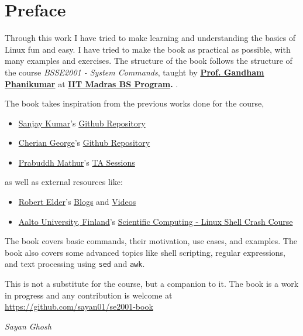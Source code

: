 \chapter*{Preface}

Through this work I have tried to make learning and
understanding the basics of Linux fun and easy. I have
tried to make the book as practical as possible, with
many examples and exercises. The structure of the book
follows the structure of the course \textit{BSSE2001
- System Commands}, taught by
\textbf{
\href{https://home.iitm.ac.in/gphani/}{Prof. Gandham Phanikumar}
}
at
\textbf{
\href{https://study.iitm.ac.in/ds/}{IIT Madras BS Program}.
}.

The book takes inspiration from the previous works done for the course,

\begin{itemize}
	\item \href{https://github.com/prassr}{Sanjay Kumar}'s
	\href{https://github.com/prassr/gnu-linux-commands}{Github Repository}
	\item \href{https://github.com/cheriangeorge}{Cherian George}'s
	\href{https://github.com/prassr/gnu-linux-commands}{Github Repository}
	\item \href{https://github.com/prabuddhmathur}{Prabuddh Mathur}'s
	\href{https://www.youtube.com/playlist?list=PLLuZiiAWg2wpaEOBWAVO7Jl35MQkOyi6-}{TA Sessions}
\end{itemize}

as well as external resources like:

\begin{itemize}
	\item \href{https://www.robertelder.org/}{Robert Elder}'s
	\href{https://blog.robertelder.org/}{Blogs} and
	\href{https://www.youtube.com/@RobertElderSoftware/shorts}{Videos}
	\item \href{https://www.aalto.fi/en}{Aalto University, Finland}'s
	\href{https://scicomp.aalto.fi/scicomp/shell/}{Scientific Computing - Linux Shell Crash Course}
\end{itemize}

The book covers basic commands, their motivation, use cases, and examples.
The book also covers some advanced topics like shell scripting, regular expressions, and text processing using \texttt{sed} and \texttt{awk}.

This is not a substitute for the course, but a companion to it.
The book is a work in progress and any contribution is welcome at
\url{https://github.com/sayan01/se2001-book}

\begin{flushright}
	\textit{Sayan Ghosh}
\end{flushright}
